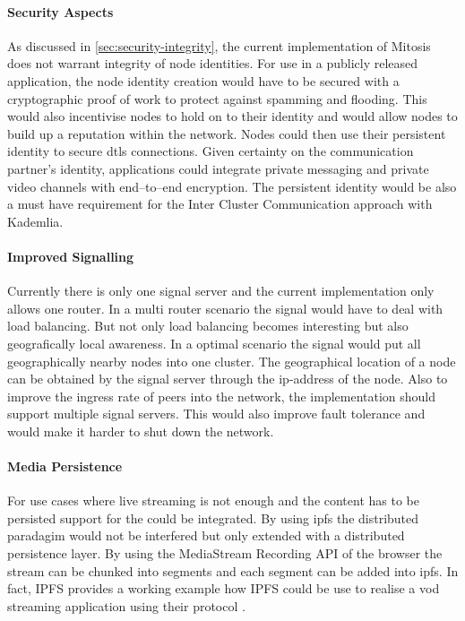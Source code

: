 \paragraph{Security Aspects}
As discussed in \vref{sec:security-integrity}, the current implementation of Mitosis does not warrant integrity of node identities. For use in a publicly released application, the node identity creation would have to be secured with a cryptographic proof of work to protect against spamming and flooding. This would also incentivise nodes to hold on to their identity and would allow nodes to build up a reputation within the network. Nodes could then use their persistent identity to secure \gls{dtls} connections. Given certainty on the communication partner's identity, applications could integrate private messaging and private video channels with end–to–end encryption. The persistent identity would be also a must have requirement for the Inter Cluster Communication approach with Kademlia.

\paragraph{Improved Signalling}
Currently there is only one signal server and the current implementation only allows one router. In a multi router scenario the signal would have to deal with load balancing. But not only load balancing becomes interesting but also geografically local awareness. In a optimal scenario the signal would put all geographically nearby nodes into one cluster. The geographical location of a node can be obtained by the signal server through the ip-address of the node.
Also to improve the ingress rate of peers into the network, the implementation should support multiple signal servers. This would also improve fault tolerance and would make it harder to shut down the network.

\paragraph{Media Persistence}
For use cases where live streaming is not enough and the content has to be persisted support for the  could be integrated. By using \gls{ipfs} the distributed paradagim would not be interfered but only extended with a distributed persistence layer. 
By using the MediaStream Recording API of the browser \cite{media-recorder-api} the stream can be chunked into segments and each segment can be added into \gls{ipfs}. In fact, IPFS provides a working example how IPFS could be use to realise a \gls{vod} streaming application using their protocol \cite{js-ipfs-video-streaming}.